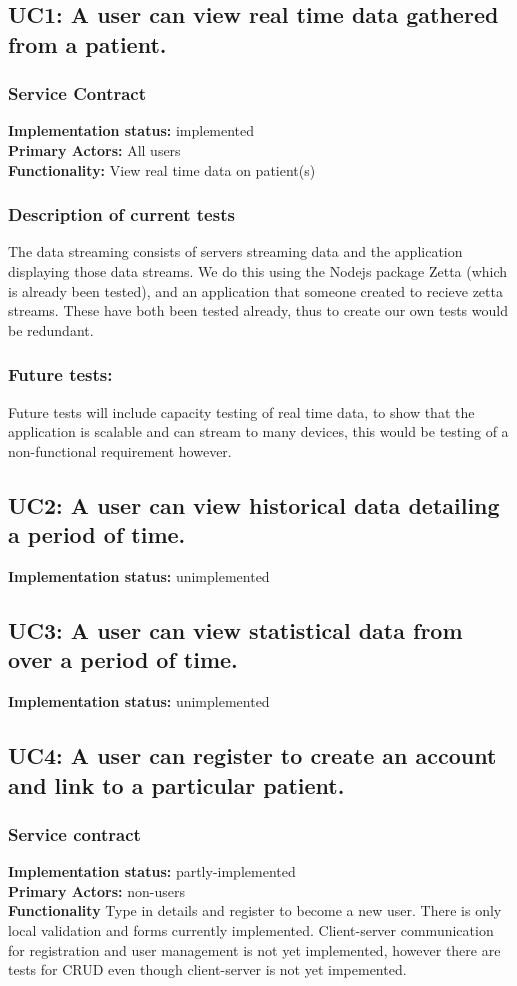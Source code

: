 \documentclass[12pt]{article}
\begin{document}
{	\subsection{UC1: A user can view real time data gathered from a patient. }
	\subsubsection{Service Contract}
	\textbf{Implementation status:} implemented \\
	\textbf{Primary Actors:} All users \\
	\textbf{Functionality:} View real time data on patient(s)\\
	\subsubsection{Description of current tests}
	The data streaming consists of servers streaming data and the application displaying those data streams. We do this using the Nodejs package Zetta (which is already been tested), and an application that someone created to recieve zetta streams. These have both been tested already, thus to create our own tests would be redundant.
	\subsubsection{Future tests:}
	Future tests will include capacity testing of real time data, to show that the application is scalable and can stream to many devices, this would be testing of a non-functional requirement however.

	\subsection{UC2: A user can view historical data detailing a period of time.}
	\textbf{Implementation status:} unimplemented

	\subsection{UC3: A user can view statistical data from over a period of time.}
	\textbf{Implementation status:} unimplemented

	\subsection{UC4: A user can register to create an account and link to a particular patient.}
	\subsubsection{Service contract}
	\textbf{Implementation status:} partly-implemented \\
	\textbf{Primary Actors:} non-users \\
	\textbf{Functionality} Type in details and register to become a new user. There is only local validation and forms currently implemented. Client-server communication for registration and user management is not yet implemented, however there are tests for CRUD even though client-server is not yet impemented.
}
\end{document}

